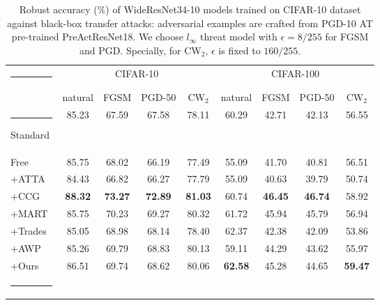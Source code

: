 \documentclass[10pt,twocolumn,letterpaper]{article}
\makeatletter
\def\hlinew#1{%
  \noalign{\ifnum0=`}\fi\hrule \@height #1 \futurelet
   \reserved@a\@xhline}
\makeatother
\begin{document}
\begin{table*}[!t]
    \caption{Robust accuracy (\%) of WideResNet34-10 models trained on CIFAR-10 dataset against black-box transfer attacks: adversarial examples are crafted from PGD-10 AT pre-trained PreActResNet18. We choose $l_{\infty}$ threat model with $\epsilon=8/255$ for FGSM and PGD. Specially, for CW$_2$, $\epsilon$ is fixed to $160/255$.}
    
    \label{transfer_attack}
    \centering
        \begin{tabular}{lcccccccc}
        \hlinew{1pt}
         \multirow{2}{*}{\textbf{Method}} 
        & \multicolumn{4}{c}{CIFAR-10} & \multicolumn{4}{c}{CIFAR-100} \\ \cline{2-9}
      &natural & FGSM          & PGD-50         & CW$_2$   &natural   & FGSM          & PGD-50         & CW$_2$   \\ \hlinew{1pt}

          Standard  & 85.23    & 67.59          & 67.58          & 78.11 & 60.29 & 42.71          & 42.13          & 56.55\\
          Free  & 85.75 & 68.02          & 66.19          & 77.49 & 55.09 & 41.70          & 40.81          & 56.51\\
           +ATTA~\cite{zheng2020efficient}  & 84.43   & 66.82          & 66.27          & 77.79 & 55.09 & 40.63          & 39.79          & 50.74\\
           +CCG~\cite{tack2021consistency}   & \textbf{88.32}      & \textbf{73.27}          & \textbf{72.89}          & \textbf{81.03} & 60.74 & \textbf{46.45}          & \textbf{46.74}          & 58.92\\ 
          +MART~\cite{Wang2020Improving}  & 85.75       & 70.23          & 69.27          & 80.32 &61.72 & 45.94          & 45.79          & 56.94 \\ 
            +Trades~\cite{Zhang2019tradeoff} & 85.05    & 68.98          & 68.14          & 78.40 & 62.37 & 42.38          & 42.09          & 53.86\\
           +AWP ~\cite{wu2020adversarial}& 85.26       & 69.79          & 68.83          & 80.13  & 59.11 & 44.29          & 43.62          & 55.97 \\ 
            +Ours &86.51     & 69.74          & 68.62          & 80.06   & \textbf{62.58} & 45.28          & 44.65          & \textbf{59.47}
          \\ \hlinew{1pt}
        \end{tabular}
    \end{table*}    
    
\end{document}

